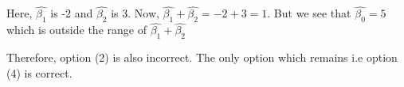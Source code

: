 \documentclass[12pt]{article}
\begin{document}
\vspace{3mm}

\noindent Here, $\hat{\beta_1}$ is -2 and $\hat{\beta_2}$ is 3. Now, $\hat{\beta_1} + \hat{\beta_2} = -2+3=1$. But we see that $\hat{\beta_0} = 5$ which is outside the range of $\hat{\beta_1} + \hat{\beta_2}$

\vspace{3mm}
\noindent Therefore, option (2) is also incorrect. The only option which remains i.e option (4) is correct.
\end{document}
